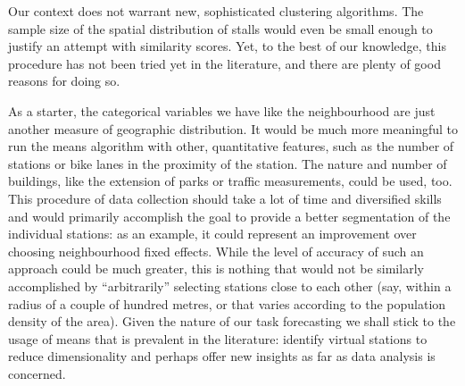\documentclass[letterpaper,10pt,english]{jupyterBook}
\begin{document}
\sphinxAtStartPar
Our context does not warrant new, sophisticated clustering algorithms. The sample size of the spatial distribution of stalls would even be small enough to justify an attempt with similarity scores. Yet, to the best of our knowledge, this procedure has not been tried yet in the literature, and there are plenty of good reasons for doing so.

\sphinxAtStartPar
As a starter, the categorical variables we have \sphinxhyphen{} like the neighbourhood \sphinxhyphen{} are just another measure of geographic distribution. It would be much more meaningful to run the \sphinxhyphen{}means algorithm with other, quantitative features, such as the number of stations or bike lanes in the proximity of the station. The nature and number of buildings, like the extension of parks or traffic measurements, could be used, too. This procedure of data collection should take a lot of time and diversified skills and would primarily accomplish the goal to provide a better segmentation of the individual stations: as an example, it could represent an improvement over choosing neighbourhood fixed effects. While the level of accuracy of such an approach could be much greater, this is nothing that would not be similarly accomplished by “arbitrarily” selecting stations close to each other (say, within a radius of a couple of hundred metres, or that varies according to the population density of the area). Given the nature of our task \sphinxhyphen{} forecasting \sphinxhyphen{} we shall stick to the usage of \sphinxhyphen{}means that is prevalent in the literature: identify virtual stations to reduce dimensionality and perhaps offer new insights as far as data analysis is concerned.
\end{document}
